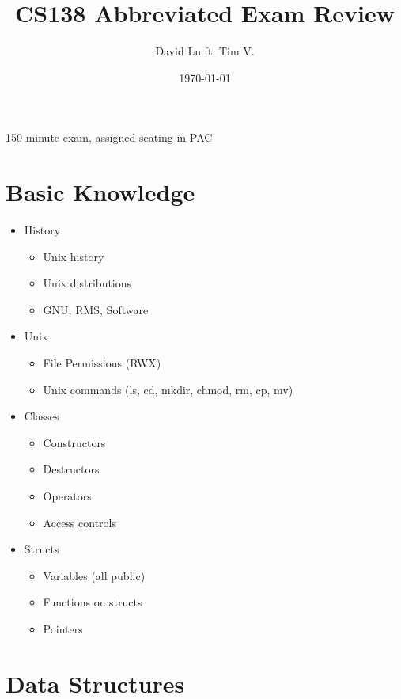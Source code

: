 \documentclass{article}
\begin{document}
\title{CS138 Abbreviated Exam Review}
\date{\today}
\author{David Lu ft. Tim V.}

\maketitle

150 minute exam, assigned seating in PAC

\begin{multicols}{2}
\section{Basic Knowledge}

\begin{itemize}
	\item{History}
	\begin{itemize}
		\item{Unix history}
		\item{Unix distributions}
		\item{GNU, RMS, Software}
	\end{itemize}
	\item{Unix}
	\begin{itemize}
		\item{File Permissions (RWX)}
		\item{Unix commands (ls, cd, mkdir, chmod, rm, cp, mv)}
	\end{itemize}
	\item{Classes}
	\begin{itemize}
		\item{Constructors}
		\item{Destructors}
		\item{Operators}
		\item{Access controls}
	\end{itemize}
	\item{Structs}
	\begin{itemize}
		\item{Variables (all public)}
		\item{Functions on structs}
		\item{Pointers}
	\end{itemize}
\end{itemize}

\section{Data Structures}


\end{multicols}
\end{document}
